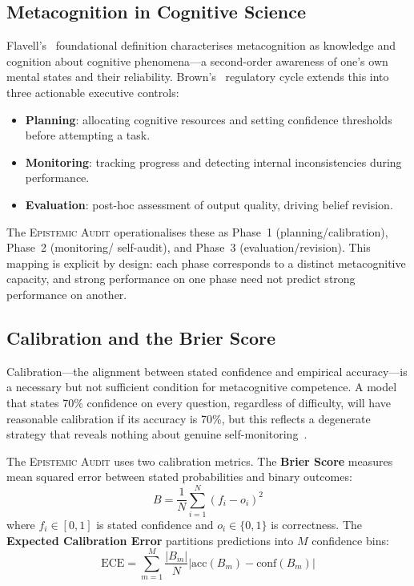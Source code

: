 \documentclass[12pt,a4paper]{article}
\newcommand{\EA}{\textsc{Epistemic Audit}}
\begin{document}
\subsection{Metacognition in Cognitive Science}

Flavell's~\citeyearpar{flavell1979metacognition} foundational definition characterises
metacognition as knowledge and cognition about cognitive phenomena---a second-order
awareness of one's own mental states and their reliability. Brown's~\citeyearpar{brown1978knowing}
regulatory cycle extends this into three actionable executive controls:

\begin{itemize}
    \item \textbf{Planning}: allocating cognitive resources and setting confidence thresholds
          before attempting a task.
    \item \textbf{Monitoring}: tracking progress and detecting internal inconsistencies
          during performance.
    \item \textbf{Evaluation}: post-hoc assessment of output quality, driving belief revision.
\end{itemize}

The \EA{} operationalises these as Phase~1 (planning/calibration), Phase~2 (monitoring/
self-audit), and Phase~3 (evaluation/revision). This mapping is explicit by design: each
phase corresponds to a distinct metacognitive capacity, and strong performance on one phase
need not predict strong performance on another.

\subsection{Calibration and the Brier Score}

Calibration---the alignment between stated confidence and empirical accuracy---is a necessary
but not sufficient condition for metacognitive competence. A model that states 70\% confidence
on every question, regardless of difficulty, will have reasonable calibration if its accuracy
is 70\%, but this reflects a degenerate strategy that reveals nothing about genuine
self-monitoring~\citep{guo2017calibration}.

The \EA{} uses two calibration metrics. The \textbf{Brier Score} measures mean squared error
between stated probabilities and binary outcomes:
\begin{equation}
    B = \frac{1}{N} \sum_{i=1}^{N} \left(f_i - o_i\right)^2
    \label{eq:brier}
\end{equation}
where $f_i \in [0,1]$ is stated confidence and $o_i \in \{0,1\}$ is correctness.
The \textbf{Expected Calibration Error} partitions predictions into $M$ confidence bins:
\begin{equation}
    \text{ECE} = \sum_{m=1}^{M} \frac{|B_m|}{N} \left| \text{acc}(B_m) - \text{conf}(B_m) \right|
    \label{eq:ece}
\end{equation}
\end{document}
